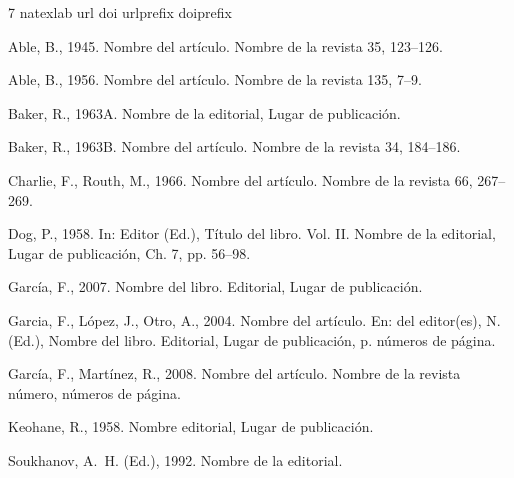 \documentclass[final,5p,times,twocolumn,authoryear,10pt]{elsarticle}
\begin{document}









\begin{thebibliography}{7}
\expandafter\ifx\csname natexlab\endcsname\relax\def\natexlab#1{#1}\fi
\expandafter\ifx\csname url\endcsname\relax
  \def\url#1{\texttt{#1}}\fi
\expandafter\ifx\csname doi\endcsname\relax
  \def\doi#1{\texttt{#1}}\fi
\expandafter\ifx\csname urlprefix\endcsname\relax\def\urlprefix{URL: }\fi
\expandafter\ifx\csname doiprefix\endcsname\relax\def\doiprefix{DOI: }\fi

Able, B., 1945. Nombre del artículo. Nombre de la revista 35, 123--126.

Able, B., 1956. Nombre del artículo. Nombre de la revista 135, 7--9.

\bibitem[{(Baker, 1963{\natexlab{A}})}]{Bak:63a}
Baker, R., 1963{\natexlab{A}}. Nombre de la editorial, Lugar de publicación.

\bibitem[{(Baker, 1963{\natexlab{B}})}]{Bak:63b}
Baker, R., 1963{\natexlab{B}}. Nombre del artículo. Nombre de la revista 34, 184--186.

Charlie, F., Routh, M., 1966. Nombre del artículo. Nombre de la revista 66, 267--269.

Dog, P., 1958. In: Editor (Ed.), Título del libro. Vol. II. Nombre de la editorial, Lugar de publicación, Ch. 7, pp. 56–98.

García, F., 2007. Nombre del libro. Editorial, Lugar de publicación.

Garcia, F., López, J., Otro, A., 2004. Nombre del artículo. En: del editor(es), N. (Ed.), Nombre del libro. Editorial, Lugar de publicación, p. números de página.

García, F., Martínez, R., 2008. Nombre del artículo. Nombre de la revista número, {}números de página.
  
Keohane, R., 1958. Nombre editorial, Lugar de publicación.

Soukhanov, A.~H. (Ed.), 1992. Nombre de la editorial.

\end{thebibliography}
\end{document}
